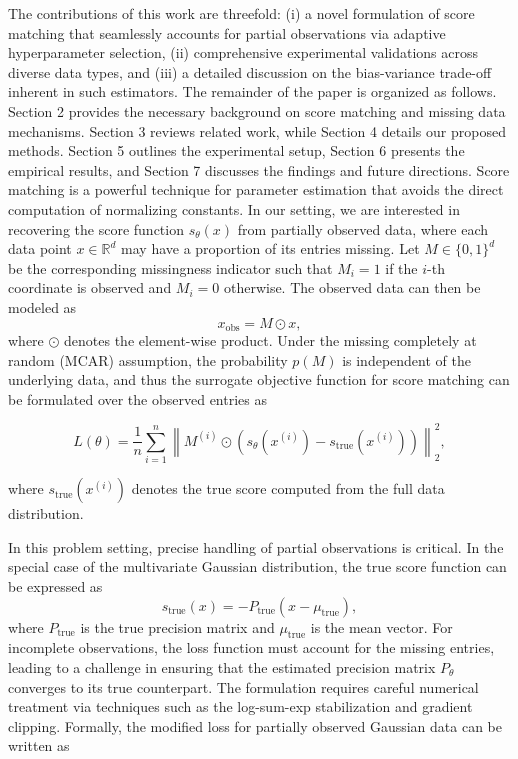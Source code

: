 \documentclass{article} %
\begin{document}
The contributions of this work are threefold: (i) a novel formulation of score matching that seamlessly accounts for partial observations via adaptive hyperparameter selection, (ii) comprehensive experimental validations across diverse data types, and (iii) a detailed discussion on the bias-variance trade-off inherent in such estimators. The remainder of the paper is organized as follows. Section 2 provides the necessary background on score matching and missing data mechanisms. Section 3 reviews related work, while Section 4 details our proposed methods. Section 5 outlines the experimental setup, Section 6 presents the empirical results, and Section 7 discusses the findings and future directions.
Score matching is a powerful technique for parameter estimation that avoids the direct computation of normalizing constants. In our setting, we are interested in recovering the score function \( s_{\theta}(x) \) from partially observed data, where each data point \( x \in \mathbb{R}^d \) may have a proportion of its entries missing. Let \( M \in \{0,1\}^d \) be the corresponding missingness indicator such that \( M_i = 1 \) if the \( i \)-th coordinate is observed and \( M_i = 0 \) otherwise. The observed data can then be modeled as
\[
x_{\mathrm{obs}} = M \odot x,
\]
where \( \odot \) denotes the element-wise product. Under the missing completely at random (MCAR) assumption, the probability \( p(M) \) is independent of the underlying data, and thus the surrogate objective function for score matching can be formulated over the observed entries as


\[
L(\theta) = \frac{1}{n} \sum_{i=1}^n \left\| M^{(i)} \odot \left(s_\theta(x^{(i)}) - s_{\mathrm{true}}(x^{(i)})\right) \right\|_2^2,
\]

where \( s_{\mathrm{true}}(x^{(i)}) \) denotes the true score computed from the full data distribution.

In this problem setting, precise handling of partial observations is critical. In the special case of the multivariate Gaussian distribution, the true score function can be expressed as
\[
s_{\mathrm{true}}(x) = -P_{\mathrm{true}} (x - \mu_{\mathrm{true}}),
\]
where \( P_{\mathrm{true}} \) is the true precision matrix and \( \mu_{\mathrm{true}} \) is the mean vector. For incomplete observations, the loss function must account for the missing entries, leading to a challenge in ensuring that the estimated precision matrix \( P_{\theta} \) converges to its true counterpart. The formulation requires careful numerical treatment via techniques such as the log-sum-exp stabilization and gradient clipping. Formally, the modified loss for partially observed Gaussian data can be written as
\end{document}
